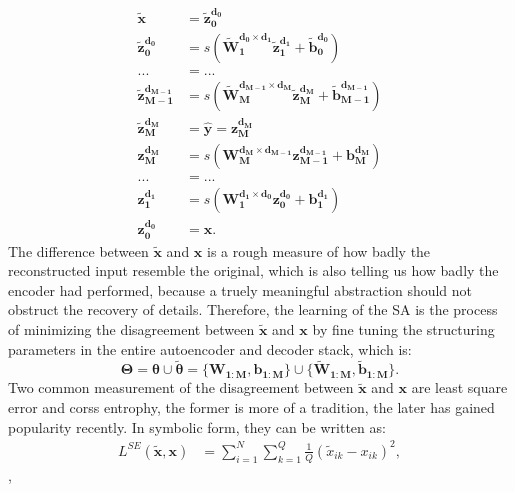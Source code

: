 \begin{equation} \label{eq:ED}
\begin{split}
  \boldsymbol{\tilde{x}}                 &= \boldsymbol{\tilde{z}_{0  }^{d_{0  }}} \\
  \boldsymbol{\tilde{z}_{0  }^{d_{0  }}} &= s(\boldsymbol{\tilde{W}_{1  }^{d_{0  } \times d_{1  }} \tilde{z}_{1  }^{d_{1  }}}+\boldsymbol{\tilde{b}_{0  }^{d_{0  }}}) \\
  ... &= ... \\
  \boldsymbol{\tilde{z}_{M-1}^{d_{M-1}}} &= s(\boldsymbol{\tilde{W}_{M  }^{d_{M-1} \times d_{M  }} \tilde{z}_{M  }^{d_{M  }}}+\boldsymbol{\tilde{b}_{M-1}^{d_{M-1}}}) \\
  \boldsymbol{\tilde{z}_{M  }^{d_{M  }}} &= \boldsymbol{\hat{y}} = \boldsymbol{z_{M  }^{d_{M  }}} \\
  \boldsymbol{z_{M  }^{d_{M  }}}         &= s(\boldsymbol{W_{M  }^{d_{M  } \times d_{M-1}} z_{M-1}^{d_{M-1}}}+\boldsymbol{b_{M  }^{d_{M  }}}) \\
  ... &= ... \\
  \boldsymbol{z_{1  }^{d_{1  }}}         &= s(\boldsymbol{W_{1  }^{d_{1  } \times d_{0  }} z_{0  }^{d_{0  }}}+\boldsymbol{b_{1  }^{d_{1  }}}) \\
  \boldsymbol{z_{0  }^{d_{0  }}}         &= \boldsymbol{x}.
\end{split}
\end{equation}
The difference between $\boldsymbol{\tilde{x}}$ and $\boldsymbol{x}$ is a rough measure of how badly the reconstructed input resemble the original, which is also telling us how badly the encoder had performed, because a truely meaningful abstraction should not obstruct the recovery of details. Therefore, the learning of the SA is the process of minimizing the disagreement between $\boldsymbol{\tilde{x}}$ and $\boldsymbol{x}$ by fine tuning the structuring parameters in the entire autoencoder and decoder stack, which is:
\[
\boldsymbol{\Theta} = \boldsymbol{\theta} \cup \boldsymbol{\tilde{\theta}}=\{\boldsymbol{W_{1:M}},\boldsymbol{b_{1:M}}\} \cup \{\boldsymbol{\tilde{W}_{1:M}}, \boldsymbol{\tilde{b}_{1:M}}\}.
\]
Two common measurement of the disagreement between $\boldsymbol{\tilde{x}}$ and $\boldsymbol{x}$ are least square error and corss entrophy, the former is more of a tradition, the later has gained popularity recently. In symbolic form, they can be written as:
\begin{equation} \label{eq:SE}
\begin{split}
  L^{SE}(\boldsymbol{\tilde{x}},\boldsymbol{x}) &= \sum_{i=1}^N\sum_{k=1}^Q\frac{1}{Q}(\tilde{x}_{ik}-x_{ik})^2,
\end{split}
\end{equation},
